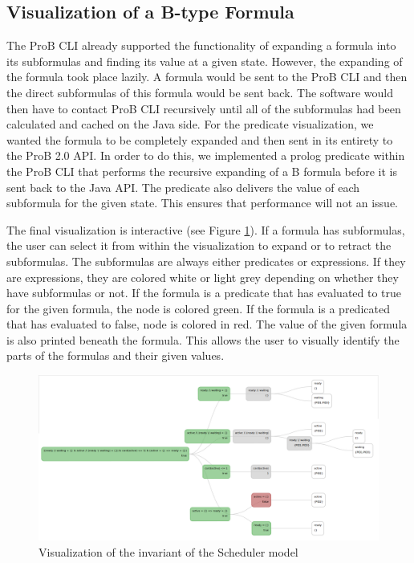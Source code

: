 \subsection{Visualization of a B-type Formula}

The ProB CLI already supported the functionality of expanding a formula into its subformulas and finding its value at a given state. However, the expanding of the formula took place lazily. A formula would be sent to the ProB CLI and then the direct subformulas of this formula would be sent back. The software would then have to contact ProB CLI recursively until all of the subformulas had been calculated and cached on the Java side. For the predicate visualization, we wanted the formula to be completely expanded and then sent in its entirety to the ProB 2.0 API. In order to do this, we implemented a prolog predicate within the ProB CLI that performs the recursive expanding of a B formula before it is sent back to the Java API. The predicate also delivers the value of each subformula for the given state. This ensures that performance will not an issue. 

The final visualization is interactive (see Figure \ref{predicate}). If a formula has subformulas, the user can select it from within the visualization to expand or to retract the subformulas. The subformulas are always either predicates or expressions. If they are expressions, they are colored white or light grey depending on whether they have subformulas or not. If the formula is a predicate that has evaluated to true for the given formula, the node is colored green. If the formula is a predicated that has evaluated to false, node is colored in red. The value of the given formula is also printed beneath the formula. This allows the user to visually identify the parts of the formulas and their given values. 

\begin{center}
\begin{figure}[h!]
\includegraphics[width=14cm]{bilder/invariant.png}
\caption{Visualization of the invariant of the Scheduler model}
\label{predicate}
\end{figure}
\end{center}


